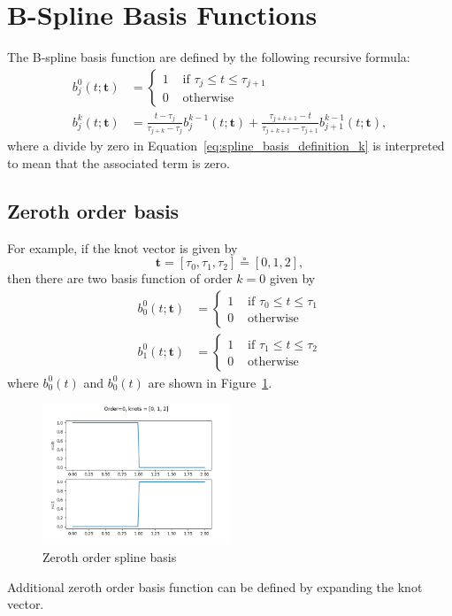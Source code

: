 \documentclass{article}
\newcommand{\defeq}{\circeq}
\begin{document}
\section{B-Spline Basis Functions}
\label{sec:b-spline-basis-functions}

The B-spline basis function are defined by the following recursive formula:
\begin{align}
b_j^0(t; \mathbf{t}) &= \begin{cases} 1 & \text{~if~} \tau_j \leq t \leq \tau_{j+1} \\ 
 									 0 & \text{~otherwise} 
 					   \end{cases} 
	\label{eq:spline_basis_definition_0}\\	
b_j^k(t; \mathbf{t}) &= \frac{t-\tau_j}{\tau_{j+k}-
\tau_j} b_j^{k-1}(t; \mathbf{t}) + \frac{\tau_{j+k+1}-t}{\tau_{j+k+1}-\tau_{j+1}} b_{j+1}^{k-1}(t; \mathbf{t}),
	\label{eq:spline_basis_definition_k}
\end{align}
where a divide by zero in Equation~\eqref{eq:spline_basis_definition_k} is interpreted to mean that the associated term is zero.

\subsection{Zeroth order basis}

For example, if the knot vector is given by
\[
\mathbf{t} = [\tau_0, \tau_1, \tau_2] \defeq [0, 1, 2],
\]
then there are two basis function of order $k=0$ given by
\begin{align*}
b_0^0(t; \mathbf{t}) &= \begin{cases} 1 & \text{~if~} \tau_0 \leq t \leq \tau_1 \\ 
 									 0 & \text{~otherwise} 
 			\end{cases}
\\ 
b_1^0(t; \mathbf{t}) &= \begin{cases} 1 & \text{~if~} \tau_1 \leq t \leq \tau_2 \\ 
 									 0 & \text{~otherwise}
 			\end{cases}
\end{align*}
where $b_0^0(t)$ and $b_0^0(t)$ are shown in Figure~\ref{fig:spline_basis_0}.
\begin{figure}[hbt]
  \centering\includegraphics[width=0.5\textwidth]{./figures/spline_basis_0}
  \caption{Zeroth order spline basis}
  \label{fig:spline_basis_0}  
\end{figure}
Additional zeroth order basis function can be defined by expanding the knot vector.
\end{document}
